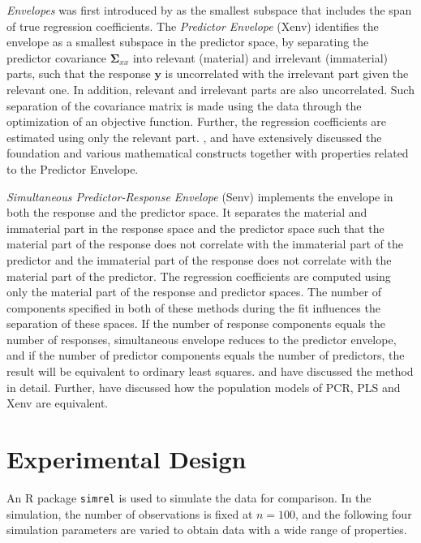 \documentclass[12pt,3p,authoryear]{elsarticle}
\begin{document}
\emph{Envelopes} was first introduced by \citep{Cook2007a} as the
smallest subspace that includes the span of true regression
coefficients. The \emph{Predictor Envelope} (Xenv) identifies the
envelope as a smallest subspace in the predictor space, by separating
the predictor covariance \(\boldsymbol{\Sigma}_{xx}\) into relevant
(material) and irrelevant (immaterial) parts, such that the response
\(\mathbf{y}\) is uncorrelated with the irrelevant part given the
relevant one. In addition, relevant and irrelevant parts are also
uncorrelated. Such separation of the covariance matrix is made using the
data through the optimization of an objective function. Further, the
regression coefficients are estimated using only the relevant part.
\citet{cook2010envelope}, \citet{cook2013envelopes} and
\citet{cook2018envelope} have extensively discussed the foundation and
various mathematical constructs together with properties related to the
Predictor Envelope.

\emph{Simultaneous Predictor-Response Envelope} (Senv) implements the
envelope in both the response and the predictor space. It separates the
material and immaterial part in the response space and the predictor
space such that the material part of the response does not correlate
with the immaterial part of the predictor and the immaterial part of the
response does not correlate with the material part of the predictor. The
regression coefficients are computed using only the material part of the
response and predictor spaces. The number of components specified in
both of these methods during the fit influences the separation of these
spaces. If the number of response components equals the number of
responses, simultaneous envelope reduces to the predictor envelope, and
if the number of predictor components equals the number of predictors,
the result will be equivalent to ordinary least squares.
\citet{cook2015simultaneous} and \citet{cook2018envelope} have discussed
the method in detail. Further, \citet{helland2016algorithms} have
discussed how the population models of PCR, PLS and Xenv are equivalent.

\hypertarget{experimental-design}{\section{Experimental
Design}\label{experimental-design}}

An R \citep{coreR2018} package \texttt{simrel}
\citep{Rimal2018, saebo2015simrel} is used to simulate the data for
comparison. In the simulation, the number of observations is fixed at
\(n = 100\), and the following four simulation parameters are varied to
obtain data with a wide range of properties.
\end{document}
